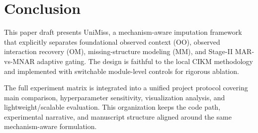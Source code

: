 \section{Conclusion}

This paper draft presents UniMiss, a mechanism-aware imputation framework that explicitly separates foundational observed context (OO), observed interaction recovery (OM), missing-structure modeling (MM), and Stage-II MAR-vs-MNAR adaptive gating. The design is faithful to the local CIKM methodology and implemented with switchable module-level controls for rigorous ablation.

The full experiment matrix is integrated into a unified project protocol covering main comparison, hyperparameter sensitivity, visualization analysis, and lightweight/scalable evaluation. This organization keeps the code path, experimental narrative, and manuscript structure aligned around the same mechanism-aware formulation.
